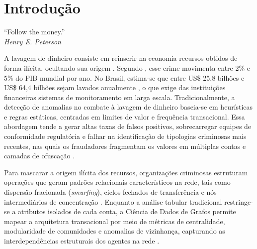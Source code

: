 \documentclass[titlepage,a4paper,oneside,onecolumn,12pt]{report}
\makeatletter
\let\setcounter\@gobbletwo
\newcommand{\mainmatter}{\clearpage\pagenumbering{arabic}\setcounter{page}{1}}
\newenvironment{epigrafeonline}{\begin{flushright}\begin{minipage}{0.55\textwidth}}{\end{minipage}\end{flushright}}
\makeatother
\begin{document}
\sumario
\mainmatter 

\chapter*{Introdução}

\begin{epigrafeonline}
\hfill ``Follow the money.''\hspace{0.2cm}\null\\
\hspace*{\fill}\textit{Henry E. Peterson}\\
\end{epigrafeonline}

A lavagem de dinheiro consiste em reinserir na economia recursos obtidos de forma ilícita, ocultando sua origem \cite{coaf2021cartilha}. Segundo , esse crime movimenta entre 2\% e 5\% do PIB mundial por ano. No Brasil, estima-se que entre US\$ 25,8 bilhões e US\$ 64,4 bilhões sejam lavados anualmente \cite{vinciworks, kar2014brazil, brasil2021nra}, o que exige das instituições financeiras sistemas de monitoramento em larga escala. Tradicionalmente, a detecção de anomalias no combate à lavagem de dinheiro baseia-se em heurísticas e regras estáticas, centradas em limites de valor e frequência transacional. Essa abordagem tende a gerar altas taxas de falsos positivos, sobrecarregar equipes de conformidade regulatória e falhar na identificação de tipologias criminosas mais recentes, nas quais os fraudadores fragmentam os valores em múltiplas contas e camadas de ofuscação \cite{jensen2023fighting}.

Para mascarar a origem ilícita dos recursos, organizações criminosas estruturam operações que geram padrões relacionais característicos na rede, tais como dispersão fracionada (\textit{smurfing}), ciclos fechados de transferência e nós intermediários de concentração \cite{cheng2025graph, dumitrescu2022anomaly, fatf2018concealment}. Enquanto a análise tabular tradicional restringe-se a atributos isolados de cada conta, a Ciência de Dados de Grafos permite mapear a arquitetura transacional por meio de métricas de centralidade, modularidade de comunidades e anomalias de vizinhança, capturando as interdependências estruturais dos agentes na rede \cite{baigabyl2025using}.
\end{document}
